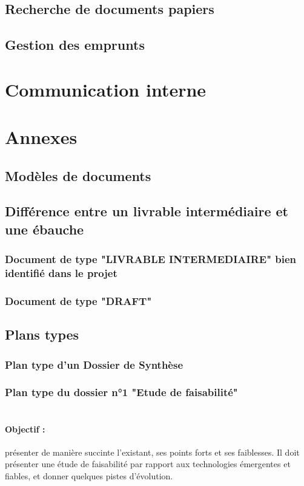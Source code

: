   \subsection{Recherche de documents papiers}
  \subsection{Gestion des emprunts}
\section{Communication interne}
\section{Annexes}
  \subsection{Modèles de documents}
  \subsection{Différence entre un livrable intermédiaire et une ébauche}     
    \subsubsection{Document de type "LIVRABLE INTERMEDIAIRE" bien identifié dans le projet}
    \subsubsection{Document de type "DRAFT"}
  \subsection{Plans types}     
    \subsubsection{Plan type d'un Dossier de Synthèse}
    
    \subsubsection{Plan type du dossier n°1 "Etude de faisabilité"}
      \paragraph*{\\Objectif :}
        présenter de manière succinte l'existant, ses points forts et ses faiblesses. Il doit
        présenter une étude de faisabilité par rapport aux technologies émergentes et fiables, et donner quelques pistes d'évolution.
